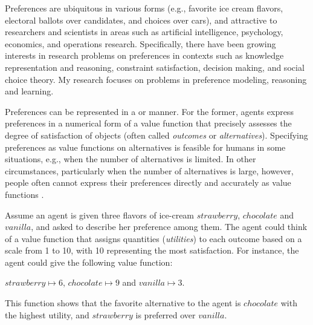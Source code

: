 Preferences are ubiquitous in various forms (e.g.,
favorite ice cream flavors, electoral ballots over candidates, and choices over cars),
and attractive to researchers and scientists in areas such as 
artificial intelligence, psychology, economics, and operations research.
Specifically, there have been growing interests in research problems on
preferences in contexts such as knowledge representation and reasoning, constraint 
satisfaction, decision making, and social choice theory. 
My research focuses on problems in preference modeling, 
reasoning and learning.

Preferences can be represented in a  or  manner.
For the former, agents express preferences in a numerical form of
a value function that precisely assesses the degree of satisfaction
of objects
(often called \textit{outcomes} or \textit{alternatives}).
Specifying preferences as value functions on alternatives
is feasible for humans in some situations, e.g., 
when the number of alternatives is limited.
In other circumstances, particularly when the number of alternatives is large, however,
people often cannot express their 
preferences directly and accurately as value 
functions \cite{Domshlak20111037}.

Assume an agent is given three flavors of ice-cream 
$strawberry$, $chocolate$ and $vanilla$, and asked to describe 
her preference among them.
The agent could think of a value function that
assigns quantities (\textit{utilities}) to each outcome
based on a scale from 1 to 10, with 10 representing the most satisfaction.
For instance, the agent could give the following value function:
\begin{center}
	$strawberry \mapsto 6$, $chocolate \mapsto 9$ and $vanilla \mapsto 3$.
\end{center}
This function shows that the favorite alternative to the agent is
$chocolate$ with the highest utility, and
$strawberry$ is preferred over $vanilla$.

